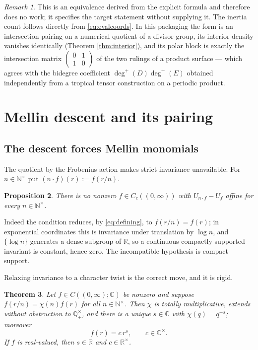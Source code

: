 \documentclass[11pt]{amsart}
\newtheorem{theorem}{Theorem}[section]
\newtheorem{proposition}[theorem]{Proposition}
\theoremstyle{definition}
\theoremstyle{remark}
\newtheorem{remark}[theorem]{Remark}
\newcommand{\C}{\mathbb C}
\newcommand{\R}{\mathbb R}
\newcommand{\N}{\mathbb N}
\newcommand{\Q}{\mathbb Q}
\begin{document}
\begin{remark}
This is an equivalence derived from the explicit formula and therefore does
no work; it specifies the target statement without supplying it.  The
inertia count follows directly from \eqref{eq:evalcoords}.  In this
packaging the form is an intersection pairing on a
numerical quotient of a divisor group, its interior density vanishes
identically (Theorem \ref{thm:interior}), and its polar block is exactly the
intersection matrix $\left(\begin{smallmatrix}0&1\\1&0\end{smallmatrix}\right)$
of the two rulings of a product surface --- which agrees with the bidegree
coefficient $\deg^+(D)\deg^+(E)$ obtained independently from a tropical
tensor construction on a periodic product.
\end{remark}

\section{Mellin descent and its pairing}

\subsection{The descent forces Mellin monomials}

The quotient by the Frobenius action makes strict invariance unavailable.
For $n\in\N^\times$ put $(n\cdot f)(r):=f(r/n)$.

\begin{proposition}\label{prop:strict}
There is no nonzero $f\in C_c((0,\infty))$ with $U_{n\cdot f}-U_f$ affine for
every $n\in\N^\times$.
\end{proposition}

Indeed the condition reduces, by \eqref{eq:defining}, to $f(r/n)=f(r)$; in
exponential coordinates this is invariance under translation by $\log n$, and
$\{\log n\}$ generates a dense subgroup of $\R$, so a continuous compactly
supported invariant is constant, hence zero.  The incompatible hypothesis is
compact support.

Relaxing invariance to a character twist is the correct move, and it is
rigid.

\begin{theorem}\label{thm:classification}
Let $f\in C((0,\infty);\C)$ be nonzero and suppose $f(r/n)=\chi(n)f(r)$ for
all $n\in\N^\times$.  Then $\chi$ is totally multiplicative, extends without
obstruction to $\Q^\times_+$, and there is a unique $s\in\C$ with
$\chi(q)=q^{-s}$; moreover
\[
 f(r)=c\,r^{s},\qquad c\in\C^\times .
\]
If $f$ is real-valued, then $s\in\R$ and $c\in\R^\times$.
\end{theorem}
\end{document}
